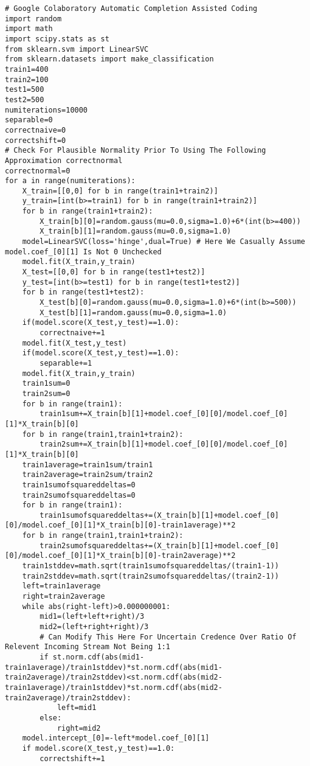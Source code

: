 \begin{verbatim}
# Google Colaboratory Automatic Completion Assisted Coding
import random
import math
import scipy.stats as st
from sklearn.svm import LinearSVC
from sklearn.datasets import make_classification
train1=400
train2=100
test1=500
test2=500
numiterations=10000
separable=0
correctnaive=0
correctshift=0
# Check For Plausible Normality Prior To Using The Following Approximation correctnormal
correctnormal=0
for a in range(numiterations):
	X_train=[[0,0] for b in range(train1+train2)]
	y_train=[int(b>=train1) for b in range(train1+train2)]
	for b in range(train1+train2):
		X_train[b][0]=random.gauss(mu=0.0,sigma=1.0)+6*(int(b>=400))
		X_train[b][1]=random.gauss(mu=0.0,sigma=1.0)
	model=LinearSVC(loss='hinge',dual=True) # Here We Casually Assume model.coef_[0][1] Is Not 0 Unchecked
	model.fit(X_train,y_train)
	X_test=[[0,0] for b in range(test1+test2)]
	y_test=[int(b>=test1) for b in range(test1+test2)]
	for b in range(test1+test2):
		X_test[b][0]=random.gauss(mu=0.0,sigma=1.0)+6*(int(b>=500))
		X_test[b][1]=random.gauss(mu=0.0,sigma=1.0)
	if(model.score(X_test,y_test)==1.0):
		correctnaive+=1
	model.fit(X_test,y_test)
	if(model.score(X_test,y_test)==1.0):
		separable+=1
	model.fit(X_train,y_train)
	train1sum=0
	train2sum=0
	for b in range(train1):
		train1sum+=X_train[b][1]+model.coef_[0][0]/model.coef_[0][1]*X_train[b][0]
	for b in range(train1,train1+train2):
		train2sum+=X_train[b][1]+model.coef_[0][0]/model.coef_[0][1]*X_train[b][0]
	train1average=train1sum/train1
	train2average=train2sum/train2
	train1sumofsquareddeltas=0
	train2sumofsquareddeltas=0
	for b in range(train1):
		train1sumofsquareddeltas+=(X_train[b][1]+model.coef_[0][0]/model.coef_[0][1]*X_train[b][0]-train1average)**2
	for b in range(train1,train1+train2):
		train2sumofsquareddeltas+=(X_train[b][1]+model.coef_[0][0]/model.coef_[0][1]*X_train[b][0]-train2average)**2
	train1stddev=math.sqrt(train1sumofsquareddeltas/(train1-1))
	train2stddev=math.sqrt(train2sumofsquareddeltas/(train2-1))
	left=train1average
	right=train2average
	while abs(right-left)>0.000000001:
		mid1=(left+left+right)/3
		mid2=(left+right+right)/3
		# Can Modify This Here For Uncertain Credence Over Ratio Of Relevent Incoming Stream Not Being 1:1
		if st.norm.cdf(abs(mid1-train1average)/train1stddev)*st.norm.cdf(abs(mid1-train2average)/train2stddev)<st.norm.cdf(abs(mid2-train1average)/train1stddev)*st.norm.cdf(abs(mid2-train2average)/train2stddev):
			left=mid1
		else:
			right=mid2
	model.intercept_[0]=-left*model.coef_[0][1]
	if model.score(X_test,y_test)==1.0:
		correctshift+=1

\end{verbatim}
